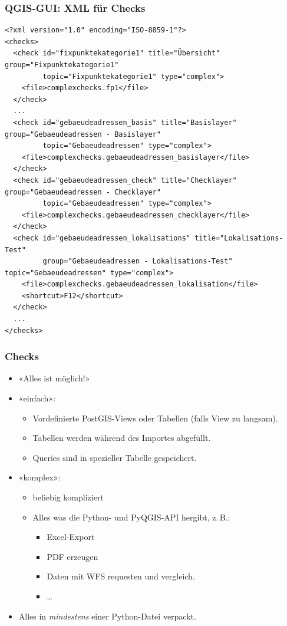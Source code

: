 \documentclass{beamer}
\begin{document}
\begin{frame}[fragile]
  \frametitle{QGIS-GUI: XML für Checks}
  \begin{tiny}
  \begin{verbatim}
<?xml version="1.0" encoding="ISO-8859-1"?>
<checks>
  <check id="fixpunktekategorie1" title="Übersicht" group="Fixpunktekategorie1" 
         topic="Fixpunktekategorie1" type="complex">
    <file>complexchecks.fp1</file>
  </check>
  ...  
  <check id="gebaeudeadressen_basis" title="Basislayer" group="Gebaeudeadressen - Basislayer" 
         topic="Gebaeudeadressen" type="complex">
    <file>complexchecks.gebaeudeadressen_basislayer</file>
  </check>   
  <check id="gebaeudeadressen_check" title="Checklayer" group="Gebaeudeadressen - Checklayer" 
         topic="Gebaeudeadressen" type="complex">
    <file>complexchecks.gebaeudeadressen_checklayer</file>
  </check>    
  <check id="gebaeudeadressen_lokalisations" title="Lokalisations-Test" 
         group="Gebaeudeadressen - Lokalisations-Test" topic="Gebaeudeadressen" type="complex">
    <file>complexchecks.gebaeudeadressen_lokalisation</file>
    <shortcut>F12</shortcut>
  </check>           
  ...
</checks>   
  \end{verbatim}
  \end{tiny}
\end{frame}

\begin{frame}[fragile]
  \frametitle{Checks}
  \begin{itemize}
  \item «Alles ist möglich!»
  \item «einfach»:
  \begin{itemize}
   \item Vordefinierte PostGIS-Views oder Tabellen (falls View zu langsam).
   \item Tabellen werden während des Importes abgefüllt.
   \item Queries sind in spezieller Tabelle gespeichert. 
  \end{itemize}
  \item «komplex»:
  \begin{itemize}
   \item beliebig kompliziert
   \item Alles was die Python- und PyQGIS-API hergibt, z.\,B.:
   \begin{itemize}
    \item Excel-Export
    \item PDF erzeugen
    \item Daten mit WFS requesten und vergleich.
    \item \ldots
   \end{itemize}

  \end{itemize}
  
  \item Alles in \textit{mindestens} einer Python-Datei verpackt.
 \end{itemize}
\end{frame}
\end{document}
